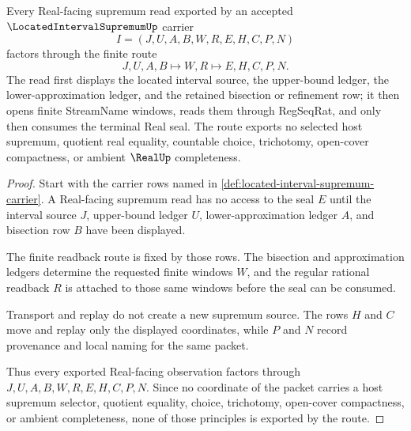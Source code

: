 \begin{theorem}
\label{thm:located-interval-supremum-real-seal-route}
Every Real-facing supremum read exported by an accepted $\LocatedIntervalSupremumUp$ carrier
$$
I=(J,U,A,B,W,R,E,H,C,P,N)
$$
factors through the finite route
$$
J,U,A,B \longmapsto W,R \longmapsto E,H,C,P,N .
$$
The read first displays the located interval source, the upper-bound ledger, the lower-approximation ledger, and the retained bisection or refinement row; it then opens finite StreamName windows, reads them through RegSeqRat, and only then consumes the terminal Real seal. The route exports no selected host supremum, quotient real equality, countable choice, trichotomy, open-cover compactness, or ambient $\RealUp$ completeness.
\end{theorem}
\begin{proof}
Start with the carrier rows named in \autoref{def:located-interval-supremum-carrier}. A Real-facing supremum read has no access to the seal $E$ until the interval source $J$, upper-bound ledger $U$, lower-approximation ledger $A$, and bisection row $B$ have been displayed.

The finite readback route is fixed by those rows. The bisection and approximation ledgers determine the requested finite windows $W$, and the regular rational readback $R$ is attached to those same windows before the seal can be consumed.

Transport and replay do not create a new supremum source. The rows $H$ and $C$ move and replay only the displayed coordinates, while $P$ and $N$ record provenance and local naming for the same packet.

Thus every exported Real-facing observation factors through $J,U,A,B,W,R,E,H,C,P,N$. Since no coordinate of the packet carries a host supremum selector, quotient equality, choice, trichotomy, open-cover compactness, or ambient completeness, none of those principles is exported by the route.
\end{proof}



